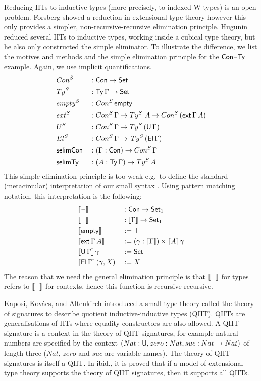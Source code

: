 \documentclass[a4paper,UKenglish,cleveref, autoref]{lipics-v2019}
\begin{document}
Reducing IITs to inductive types (more precisely, to indexed W-types)
is an open problem. Forsberg \cite{forsberg-phd} showed a reduction in
extensional type theory however this only provides a simpler,
non-recursive-recursive elimination principle. Hugunin \cite{jasper}
reduced several IITs to inductive types, working inside a cubical type
theory, but he also only constructed the simple eliminator. To
illustrate the difference, we list the motives and methods and the
simple elimination principle for the $\mathsf{Con}$--$\mathsf{Ty}$ example. Again, we
use implicit quantifications.
\begin{alignat*}{5}
  & Con^S && : \mathsf{Con}\rightarrow\mathsf{Set} \\
  & Ty^S && : \mathsf{Ty}\,\Gamma\rightarrow\mathsf{Set} \\
  & {empty}^S && : Con^S\,\mathsf{empty} \\
  & {ext}^S && : Con^S\,\Gamma\rightarrow Ty^S\,\,A\rightarrow Con^S\,(\mathsf{ext}\,\Gamma\,A) \\
  & U^S && : Con^S\,\Gamma\rightarrow Ty^S\,(\mathsf{U}\,\Gamma) \\
  & El^S && : Con^S\,\Gamma\rightarrow\,Ty^S\,(\mathsf{El}\,\Gamma) \\
  & \mathsf{selimCon} && : (\Gamma:\mathsf{Con})\rightarrow Con^S\,\Gamma \\
  & \mathsf{selimTy} && : (A:\mathsf{Ty}\,\Gamma)\rightarrow Ty^S\,A
\end{alignat*}
This simple elimination principle is too weak e.g.\ to define the
standard (metacircular) interpretation of our small syntax
\cite{ttintt}. Using pattern matching notation, this interpretation is
the following:
\begin{alignat*}{5}
  & \llbracket\mathord{\hspace{1pt}\text{--}\hspace{1pt}}\rrbracket && : \mathsf{Con}\rightarrow\mathsf{Set}_1 \\
  & \llbracket\mathord{\hspace{1pt}\text{--}\hspace{1pt}}\rrbracket && : \llbracket\Gamma\rrbracket\rightarrow\mathsf{Set}_1 \\
  & \llbracket\mathsf{empty}\rrbracket && := \top \\
  & \llbracket\mathsf{ext}\,\Gamma\,A\rrbracket && := (\gamma:\llbracket\Gamma\rrbracket)\times\llbracket A\rrbracket\,\gamma \\
  & \llbracket\mathsf{U}\,\Gamma\rrbracket\,\gamma && := \mathsf{Set} \\
  & \llbracket\mathsf{El}\,\Gamma\rrbracket\,(\gamma,X) && := X
\end{alignat*}
The reason that we need the general elimination principle is that
$\llbracket\mathord{\hspace{1pt}\text{--}\hspace{1pt}}\rrbracket$ for types refers to $\llbracket\mathord{\hspace{1pt}\text{--}\hspace{1pt}}\rrbracket$ for contexts, hence
this function is recursive-recursive.

Kaposi, Kov{\'a}cs, and Altenkirch
\cite{Kaposi:2019:CQI:3302515.3290315} introduced a small type theory
called the theory of signatures to describe quotient
inductive-inductive types (QIIT). QIITs are generalisations of IITs
where equality constructors are also allowed. A QIIT signature is a
context in the theory of QIIT signatures, for example natural numbers
are specified by the context $(Nat:\mathsf{U},zero:Nat,suc:Nat\rightarrow Nat)$ of
length three ($Nat$, $zero$ and $suc$ are variable names). The theory
of QIIT signatures is itself a QIIT. In ibid., it is proved that if a
model of extensional type theory supports the theory of QIIT
signatures, then it supports all QIITs.
\end{document}
